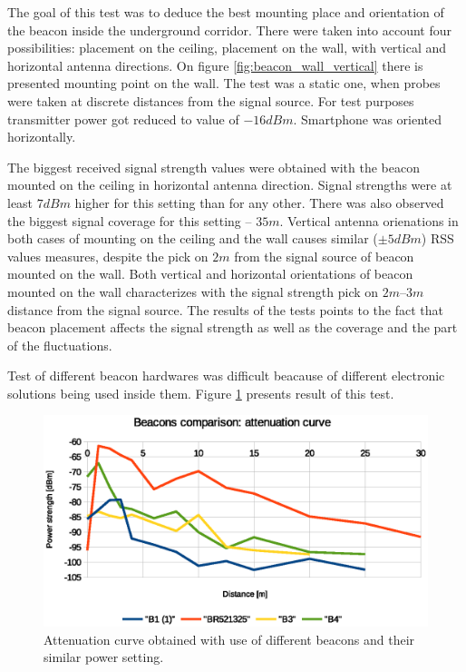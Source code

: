 \documentclass[../main.tex]{subfiles}
\begin{document}
The goal of this test was to deduce the best mounting place and orientation of the beacon inside the underground corridor. There were taken into account four possibilities: placement on the ceiling, placement on the wall, with vertical and horizontal antenna directions. On figure \ref{fig:beacon_wall_vertical} there is presented mounting point on the wall. The test was a static one, when probes were taken at discrete distances from the signal source. For test purposes transmitter power got reduced to value of $-16dBm$. Smartphone was oriented horizontally.

The biggest received signal strength values were obtained with the beacon mounted on the ceiling in horizontal antenna direction. Signal strengths were at least $7dBm$ higher for this setting than for any other. There was also observed the biggest signal coverage for this setting -- $35m$. Vertical antenna orienations in both cases of mounting on the ceiling and the wall causes similar ($\pm5dBm$) RSS values measures, despite the pick on $2m$ from the signal source of beacon mounted on the wall. Both vertical and horizontal orientations of beacon mounted on the wall characterizes with the signal strength pick on $2m$--$3m$ distance from the signal source. The results of the tests points to the fact that beacon placement affects the signal strength as well as the coverage and the part of the fluctuations.

Test of different beacon hardwares was difficult beacause of different electronic solutions being used inside them. Figure \ref{fig:tests_case8_beacons_comparison} presents result of this test.

\begin{figure}[!htbp]
\includegraphics[width=\textwidth, keepaspectratio]{pictures/tests_case8_beacons_comparison}
\centering
\caption{Attenuation curve obtained with use of different beacons and their similar power setting.}
\label{fig:tests_case8_beacons_comparison}
\end{figure}
\end{document}
